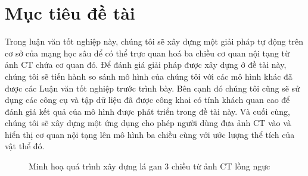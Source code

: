 \section{Mục tiêu đề tài}
Trong luận văn tốt nghiệp này, chúng tôi sẽ xây dựng một giải pháp tự động trên cơ sở của mạng học sâu để có thể trực quan hoá ba chiều cơ quan nội tạng từ ảnh CT chứa cơ quan đó. Để đánh giá giải pháp được xây dựng ở đề tài này, chúng tôi sẽ tiến hành so sánh mô hình của chúng tôi với các mô hình khác đã được các Luận văn tốt nghiệp trước trình bày. Bên cạnh đó chúng tôi cũng sẽ sử dụng các công cụ và tập dữ liệu đã được công khai có tính khách quan cao để đánh giá kết quả của mô hình được phát triển trong đề tài này. Và cuối cùng, chúng tôi sẽ xây dựng một ứng dụng cho phép người dùng đưa ảnh CT vào và hiển thị cơ quan nội tạng lên mô hình ba chiều cùng với ước lượng thể tích của vật thể đó. 

\begin{figure}
  \centering
  \caption{Minh hoạ quá trình xây dựng lá gan 3 chiều từ ảnh CT lồng ngực}
  \label{fig:ab}
\end{figure}
